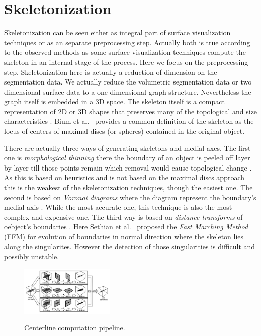 \section{Skeletonization}

Skeletonization can be seen either as integral part of surface visualization techniques or as an separate preprocessing step. Actually both is true according to the observed methods as some surface visualization techniques compute the skeleton in an internal stage of the process. Here we focus on the preprocessing step.
Skeletonization here is actually a reduction of dimension on the segmentation data. We actually reduce the volumetric segmentation data or two dimensional surface data to a one dimensional graph structure. Nevertheless the graph itself is embedded in a 3D space.
The skeleton itself is a compact representation of 2D or 3D shapes that preserves many of the topological and size characteristics \cite{alexandru2002augmented}. Bium et al.~\cite{bium1964transformation} provides a common definition of the skeleton as the locus of centers of maximal discs (or spheres) contained in the original object.

There are actually three ways of generating skeletons and medial axes. The first one is \emph{morphological thinning} there the boundary of an object is peeled off layer by layer till those points remain which removal would cause topological change \cite{alexandru2002augmented}. As this is based on heuristics and is not based on the maximal discs approach this is the weakest of the skeletonization techniques, though the easiest one. The second is based on \emph{Voronoi diagrams} where the diagram represent the boundary's medial axis \cite{alexandru2002augmented}. While the most accurate one, this technique is also the most complex and expensive one. The third way is based on \emph{distance transforms} of oebject's boundaries \cite{alexandru2002augmented}. Here Sethian et al.~\cite{sethian1996fast} proposed the \emph{Fast Marching Method} (FFM) for evolution of boundaries in normal direction where the skeleton lies along the singularites. However the detection of those singularities is difficult and possibly unstable.

\begin{figure}[h]
	\centering
	\includegraphics[width=0.4\textwidth]{./Images/CenterlineComputation.jpg} \\
	\caption{Centerline computation pipeline.}
	\cite{alexandru2002augmented}
	\label{fig:CenterlineComputation}
\end{figure} 

